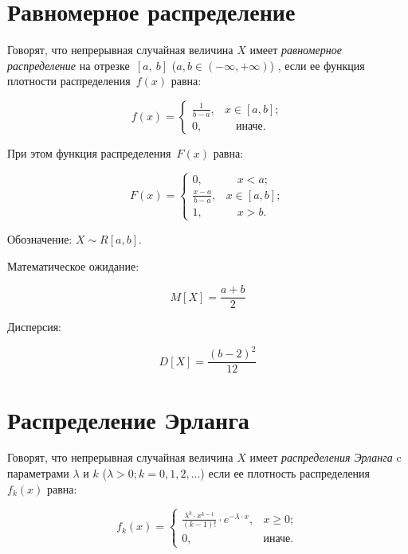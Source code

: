
\chapter{Равномерное распределение}

Говорят, что непрерывная случайная величина $X$ имеет \textit{равномерное распределение} на отрезке~$[a,~b]$ ($a, b \in (-\infty, +\infty)$) , если ее функция плотности распределения~$f(x)$ равна:

\begin{equation}
	f(x) =
	\begin{cases}
		\displaystyle\frac{1}{b - a}, & x \in [a, b];\\
		0,  & \quad \text{иначе}.
	\end{cases}
\end{equation}

При этом функция распределения~$F(x)$ равна:

\begin{equation}
	F(x) =
	\begin{cases}
		0,  & \quad x < a;\\
		\displaystyle\frac{x - a}{b - a}, & x \in [a, b];\\
		1,  & \quad x > b.
	\end{cases}
\end{equation}

Обозначение: $X \sim R[a, b]$.

Математическое ожидание:

\begin{equation}
	M[X] = \frac{a + b}{2}
\end{equation}

Дисперсия: 

\begin{equation}
	D[X] = \frac{(b - 2)^2}{12}
\end{equation}

\chapter{Распределение Эрланга} %

Говорят, что непрерывная случайная величина $X$ имеет \textit{распределения Эрланга} c параметрами $\lambda$ и $k$ ($\lambda > 0; k = 0, 1, 2, ...$) если ее плотность распределения~$f_k(x)$ равна:

\begin{equation}
	f_k(x) =
	\begin{cases}
		 \frac{\lambda^{k} \cdot x^{k-1}}{(k-1)!} \cdot e^{-\lambda \cdot x}, & x \ge 0;\\
		 0,  & \text{иначе}.
	\end{cases}
\end{equation}


